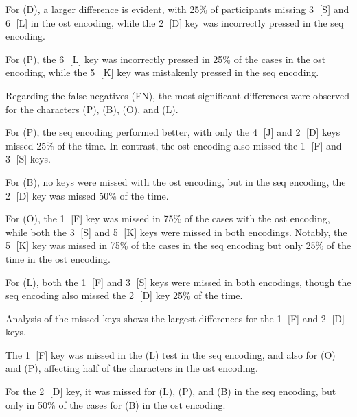 For (D), a larger difference is evident, with 25\% of participants missing \textcircled{3} [S] and \textcircled{6} [L] in the \gls{ost} encoding, while the \textcircled{2} [D] key was incorrectly pressed in the \gls{seq} encoding.

For (P), the \textcircled{6} [L] key was incorrectly pressed in 25\% of the cases in the \gls{ost} encoding, while the \textcircled{5} [K] key was mistakenly pressed in the \gls{seq} encoding.

Regarding the false negatives (FN), the most significant differences were observed for the characters (P), (B), (O), and (L). 

For (P), the \gls{seq} encoding performed better, with only the \textcircled{4} [J] and \textcircled{2} [D] keys missed 25\% of the time. In contrast, the \gls{ost} encoding also missed the \textcircled{1} [F] and \textcircled{3} [S] keys.

For (B), no keys were missed with the \gls{ost} encoding, but in the \gls{seq} encoding, the \textcircled{2} [D] key was missed 50\% of the time.

For (O), the \textcircled{1} [F] key was missed in 75\% of the cases with the \gls{ost} encoding, while both the \textcircled{3} [S] and \textcircled{5} [K] keys were missed in both encodings. Notably, the \textcircled{5} [K] key was missed in 75\% of the cases in the \gls{seq} encoding but only 25\% of the time in the \gls{ost} encoding.

For (L), both the \textcircled{1} [F] and \textcircled{3} [S] keys were missed in both encodings, though the \gls{seq} encoding also missed the \textcircled{2} [D] key 25\% of the time.

Analysis of the missed keys shows the largest differences for the \textcircled{1} [F] and \textcircled{2} [D] keys. 

The \textcircled{1} [F] key was missed in the (L) test in the \gls{seq} encoding, and also for (O) and (P), affecting half of the characters in the \gls{ost} encoding.

For the \textcircled{2} [D] key, it was missed for (L), (P), and (B) in the \gls{seq} encoding, but only in 50\% of the cases for (B) in the \gls{ost} encoding.



